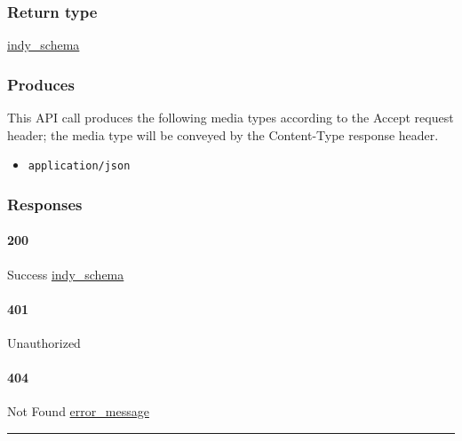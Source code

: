 \hypertarget{return-type-36}{%
\subsubsection{Return type}\label{return-type-36}}

\protect\hyperlink{indy_schema}{indy\_schema}

\hypertarget{produces-45}{%
\subsubsection{Produces}\label{produces-45}}

This API call produces the following media types according to the
{Accept} request header; the media type will be conveyed by the
{Content-Type} response header.

\begin{itemize}
\tightlist
\item
  \texttt{application/json}
\end{itemize}

\hypertarget{responses-45}{%
\subsubsection{Responses}\label{responses-45}}

\hypertarget{section-151}{%
\paragraph{200}\label{section-151}}

Success \protect\hyperlink{indy_schema}{indy\_schema}

\hypertarget{section-152}{%
\paragraph{401}\label{section-152}}

Unauthorized \protect\hyperlink{}{}

\hypertarget{section-153}{%
\paragraph{404}\label{section-153}}

Not Found \protect\hyperlink{error_message}{error\_message}

\begin{center}\rule{0.5\linewidth}{\linethickness}\end{center}


